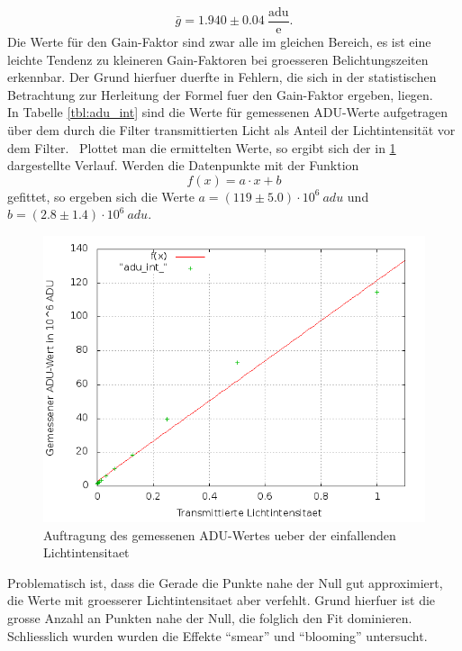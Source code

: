 \begin{equation}
\bar{g} = 1.940 \pm 0.04 \ \frac{\mathrm{adu}}{\mathrm{e}}. 
\end{equation}
Die Werte für den Gain-Faktor sind zwar alle im gleichen Bereich, es ist eine leichte Tendenz zu kleineren Gain-Faktoren bei groesseren Belichtungszeiten erkennbar. Der Grund hierfuer duerfte in Fehlern, die sich in der statistischen Betrachtung zur Herleitung der Formel fuer den Gain-Faktor ergeben, liegen. \\
In Tabelle \ref{tbl:adu_int} sind die Werte für gemessenen ADU-Werte aufgetragen über dem durch die Filter transmittierten Licht als Anteil der Lichtintensität vor dem Filter. \
Plottet man die ermittelten Werte, so ergibt sich der in \ref{plot:adu_int} dargestellte Verlauf. Werden die Datenpunkte mit der Funktion 
\begin{equation}
f(x) = a \cdot x + b
\end{equation}
gefittet, so ergeben sich die Werte $a = (119 \pm 5.0) \cdot 10^6 \ adu$ und $b = (2.8 \pm 1.4) \cdot 10^6 \ adu$.
\begin{figure}[h!]
        \includegraphics[width=.9\textwidth]{adu_int_.png}
\caption{ Auftragung des gemessenen ADU-Wertes ueber der einfallenden Lichtintensitaet }
\label{plot:adu_int}
\end{figure}
Problematisch ist, dass die Gerade die Punkte nahe der Null gut approximiert, die Werte mit groesserer Lichtintensitaet aber verfehlt. Grund hierfuer ist die grosse Anzahl an Punkten nahe der Null, die folglich den Fit dominieren. \\
Schliesslich wurden wurden die Effekte \enquote{smear} und \enquote{blooming} untersucht. 

